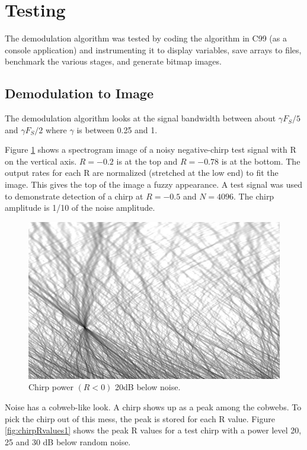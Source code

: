 \section{Testing}

The demodulation algorithm was tested by coding the algorithm in C99
(as a console application) and instrumenting it to display variables,
save arrays to files, benchmark the various stages, and generate bitmap images.

\subsection{Demodulation to Image}

The demodulation algorithm looks at the signal bandwidth between about
$\gamma F_S/5$ and $\gamma F_S/2$ where $\gamma$ is between 0.25 and 1.

Figure \ref{fig:chirpTest1} shows a spectrogram image of a noisy
negative-chirp test signal with R on the vertical axis.
$R=-0.2$ is at the top and $R=-0.78$ is at the bottom.
The output rates for each R are normalized (stretched at the low end)
to fit the image.
This gives the top of the image a fuzzy appearance.
A test signal was used to demonstrate detection of a chirp at
$R=-0.5$ and $N=4096$.
The chirp amplitude is 1/10 of the noise amplitude.
\begin{figure}
  \includegraphics[width=\linewidth]{../source/chirp42m.jpg}
  \caption{Chirp power $(R<0)$ 20dB below noise.}
  \label{fig:chirpTest1}
\end{figure}

Noise has a cobweb-like look. A chirp shows up as a peak among the cobwebs.
To pick the chirp out of this mess, the peak is stored for each R value.
Figure \ref{fig:chirpRvalues1} shows the peak R values for a test chirp with a
power level 20, 25 and 30 dB below random noise.

